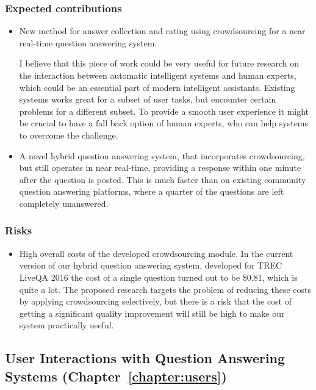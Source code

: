 \subsubsection{Expected contributions}
\label{section:proposal:plan:crowdsourcing:contributions}

\begin{itemize}
\item New method for answer collection and rating using crowdsourcing for a near real-time question answering system.

I believe that this piece of work could be very useful for future research on the interaction between automatic intelligent systems and human experts, which could be an essential part of modern intelligent assistants.
Existing systems works great for a subset of user tasks, but encounter certain problems for a different subset.
To provide a smooth user experience it might be crucial to have a fall back option of human experts, who can help systems to overcome the challenge.

\item A novel hybrid question answering system, that incorporates crowdsourcing, but still operates in near real-time, \ie providing a response within one minute after the question is posted.
This is much faster than on existing community question answering platforms, where a quarter of the questions are left completely unanswered.
\end{itemize}

\subsubsection{Risks}
\label{section:proposal:plan:crowdsourcing:risks}

\begin{itemize}
\item High overall costs of the developed crowdsourcing module.
In the current version of our hybrid question answering system, developed for TREC LiveQA 2016 the cost of a single question turned out to be \$0.81, which is quite a lot.
The proposed research targets the problem of reducing these costs by applying crowdsourcing selectively, but there is a risk that the cost of getting a significant quality improvement will still be high to make our system practically useful.
\end{itemize}

\subsection{User Interactions with Question Answering Systems (Chapter~\ref{chapter:users})}
\label{section:proposal:plan:users}

